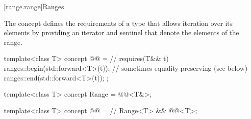 [range.range]{Ranges}

\pnum
The  concept defines the requirements of a type that allows
iteration over its elements by providing an iterator and sentinel
that denote the elements of the range.

%
\begin{itemdecl}
template<class T>
  concept @@ =          // \expos
    requires(T&& t) {
      ranges::begin(std::forward<T>(t));        // sometimes equality-preserving (see below)
      ranges::end(std::forward<T>(t));
    };

template<class T>
  concept Range = @@<T&>;

template<class T>
  concept @@ =    // \expos
    Range<T> && @@<T>;
\end{itemdecl}

